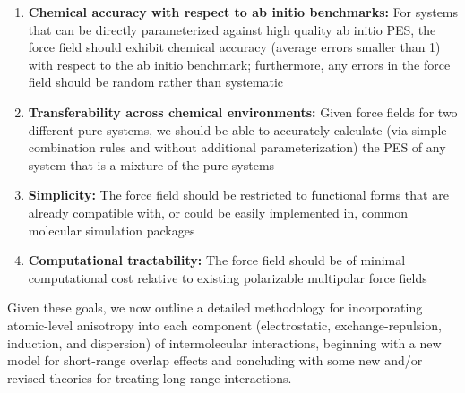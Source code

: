 \begin{enumerate}
\item \textbf{Chemical accuracy with respect to ab initio benchmarks:} For systems that can be directly parameterized against
high quality ab initio PES, the force field should exhibit chemical
accuracy (average errors smaller than 1\kjmolold)
with respect to the ab initio benchmark; furthermore, any errors in the force
field should be random rather than systematic
\item \textbf{Transferability across chemical environments:} Given force fields for two different pure systems, we
should be able to accurately calculate (via simple
combination rules and without additional
parameterization) the PES of any system that
is a mixture of the pure systems
\item \textbf{Simplicity:} The force field should be restricted to functional forms
that are already compatible with, or could be easily implemented in, common
molecular simulation packages
\item \textbf{Computational tractability:} The force field should be of minimal computational cost
relative to existing polarizable multipolar force fields\cite{Shi2013}
\end{enumerate}

Given these goals, we now outline a detailed methodology for incorporating
atomic-level anisotropy into each component (electrostatic,
exchange-repulsion, induction, and dispersion) of intermolecular interactions,
beginning with a new model for
short-range overlap effects and concluding with some new and/or revised
theories for treating long-range interactions.

